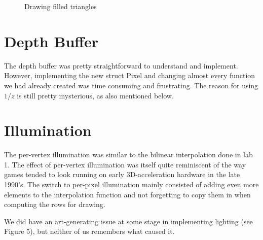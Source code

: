 \documentclass[a4paper,11pt]{article}
\begin{document}
\begin{figure}[H]
    \centering
    \qquad
    \caption{Drawing filled triangles}
\end{figure}

\section*{Depth Buffer}
The depth buffer was pretty straightforward to understand and implement. However, implementing 
the new struct Pixel and changing almost every function we had already created was time consuming and
frustrating. The reason for using $1/z$ is still pretty mysterious, as also mentioned below.

\section*{Illumination}
The per-vertex illumination was similar to the bilinear interpolation done in lab 1.
The effect of per-vertex illumination was itself quite reminiscent of the way games tended to look 
running on early 3D-acceleration hardware in the late 1990's.
The switch to per-pixel illumination mainly consisted of adding even more elements to the interpolation 
function and not forgetting to copy them in when computing the rows for drawing.

We did have an art-generating issue at some stage in implementing lighting (see Figure 5), but neither
of us remembers what caused it.
\end{document}
